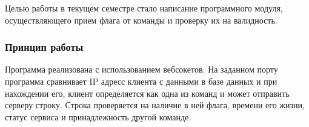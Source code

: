 Целью работы в текущем семестре стало написание программного модуля, осуществляющего прием флага от команды и проверку их на валидность.

\subsubsection{Принцип работы}

Программа реализована с использованием вебсокетов. На заданном порту программа сравнивает IP адресс клиента с данными в базе данных и при нахождении его, клиент определяется как одна из команд и может отправить серверу строку. Строка проверяется на наличие в ней флага, времени его жизни, статус сервиса и принадлежность другой команде.
